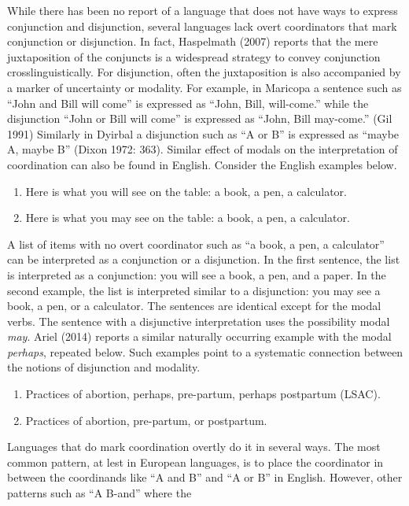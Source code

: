 \documentclass[oneside]{report}
\theoremstyle{definition}
\theoremstyle{definition}
\theoremstyle{definition}
\theoremstyle{remark}
\begin{document}
While there has been no report of a language that does not have ways to
express conjunction and disjunction, several languages lack overt
coordinators that mark conjunction or disjunction. In fact, Haspelmath
(2007) reports that the mere juxtaposition of the conjuncts is a
widespread strategy to convey conjunction crosslinguistically. For
disjunction, often the juxtaposition is also accompanied by a marker of
uncertainty or modality. For example, in Maricopa a sentence such as
``John and Bill will come'' is expressed as ``John, Bill, will-come.''
while the disjunction ``John or Bill will come'' is expressed as ``John,
Bill may-come.'' (Gil 1991) Similarly in Dyirbal a disjunction such as
``A or B'' is expressed as ``maybe A, maybe B'' (Dixon 1972: 363).
Similar effect of modals on the interpretation of coordination can also
be found in English. Consider the English examples below.
\begin{enumerate}
\def\labelenumi{(\arabic{enumi})}
\setcounter{enumi}{1}
\item
  Here is what you will see on the table: a book, a pen, a calculator.
\item
  Here is what you may see on the table: a book, a pen, a calculator.
\end{enumerate}
A list of items with no overt coordinator such as ``a book, a pen, a
calculator'' can be interpreted as a conjunction or a disjunction. In
the first sentence, the list is interpreted as a conjunction: you will
see a book, a pen, and a paper. In the second example, the list is
interpreted similar to a disjunction: you may see a book, a pen, or a
calculator. The sentences are identical except for the modal verbs. The
sentence with a disjunctive interpretation uses the possibility modal
\emph{may}. Ariel (2014) reports a similar naturally occurring example
with the modal \emph{perhaps}, repeated below. Such examples point to a
systematic connection between the notions of disjunction and modality.
\begin{enumerate}
\def\labelenumi{(\arabic{enumi})}
\setcounter{enumi}{3}
\item
  Practices of abortion, perhaps, pre-partum, perhaps postpartum (LSAC).
\item
  Practices of abortion, pre-partum, or postpartum.
\end{enumerate}
Languages that do mark coordination overtly do it in several ways. The
most common pattern, at lest in European languages, is to place the
coordinator in between the coordinands like ``A and B'' and ``A or B''
in English. However, other patterns such as ``A B-and'' where the
\end{document}
